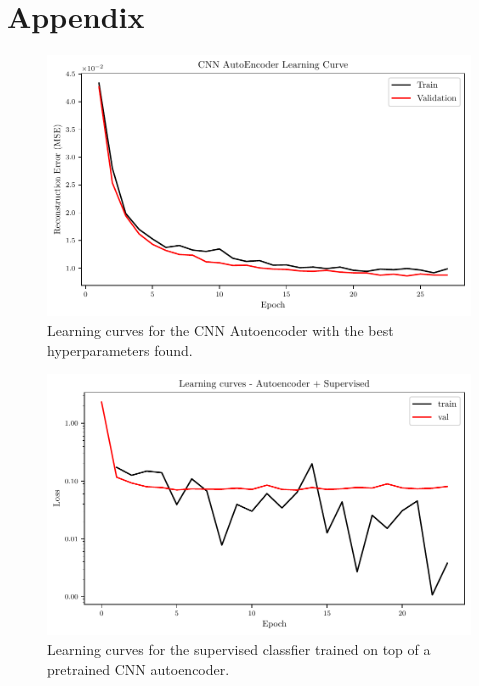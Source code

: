 \documentclass[11pt,a4paper]{scrartcl}
\begin{document}
\printbibliography
\clearpage

\section*{Appendix}

\begin{figure}[H]
    \centering
    \includegraphics[width=.9\textwidth]{../Code/Plots/best_hyperparams_learning_curve}
    \caption{Learning curves for the CNN Autoencoder with the best hyperparameters found.\label{fig:best_learning_curve}}
\end{figure}

\begin{figure}[H]
    \centering
    \includegraphics[width=.9\textwidth]{../Code/Plots/learning_curves_supervised}
    \caption{Learning curves for the supervised classfier trained on top of a pretrained CNN autoencoder.\label{fig:supervised_learning_curves}}
\end{figure}
\end{document}
